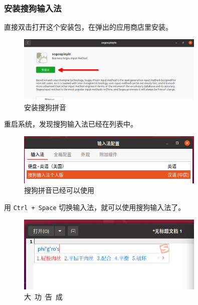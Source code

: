 \documentclass[UTF-8]{ctexart}
\begin{document}
			\subsubsection{安装搜狗输入法}
			
				直接双击打开这个安装包，在弹出的应用商店里安装。
			
				\begin{figure}[H]
					\centering
					\includegraphics[width=0.8\textwidth]{fig/sogoupinyin_install.png}
					\caption*{安装搜狗拼音}
				\end{figure}
			
				重启系统，发现搜狗输入法已经在列表中。
				
				\begin{figure}[H]
					\centering
					\includegraphics[width=0.8\textwidth]{fig/add_sogou_success.png}
					\caption*{搜狗拼音已经可以使用}
				\end{figure}
			
				用 \texttt{Ctrl + Space} 切换输入法，就可以使用搜狗输入法了。
				
				\begin{figure}[H]
					\centering
					\includegraphics[width=0.8\textwidth]{fig/sogou_success.png}
					\caption*{大~功~告~成}
				\end{figure}
				
	\newpage
				
\end{document}
